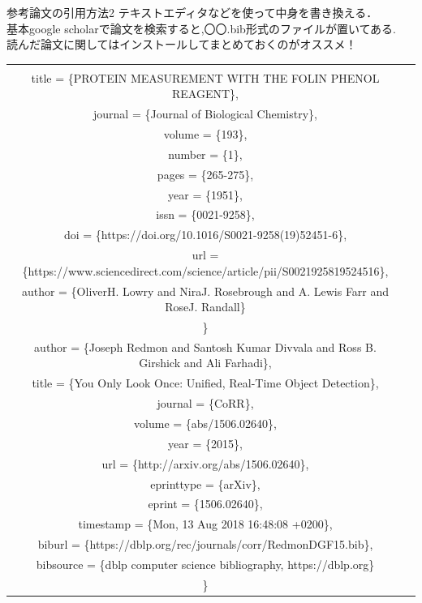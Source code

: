 \documentclass[aspectratio=169, dvipdfmx, 12pt]{beamer}
\begin{document}
\begin{frame}{参考論文の引用方法2}
    テキストエディタなどを使って中身を書き換える．\\
    {\color{red}基本google scholarで論文を検索すると,〇〇.bib形式のファイルが置いてある.\\
    読んだ論文に関してはインストールしてまとめておくのがオススメ！}
    \begin{tabular}{cc}
      \begin{minipage}[t]{0.45\hsize}
        \fontsize{5pt}{0cm}\selectfont{@article\{LOWRY1951265,\\
        title = \{PROTEIN MEASUREMENT WITH THE FOLIN PHENOL REAGENT\},\\
        journal = \{Journal of Biological Chemistry\},\\
        volume = \{193\},\\
        number = \{1\},\\
        pages = \{265-275\},\\
        year = \{1951\},\\
        issn = \{0021-9258\},\\
        doi = \{https://doi.org/10.1016/S0021-9258(19)52451-6\},\\
        url = \{https://www.sciencedirect.com/science/article/pii/S0021925819524516\},\\
        author = \{OliverH. Lowry and NiraJ. Rosebrough and A. Lewis Farr and RoseJ. Randall\}\\
        \}}
      \end{minipage} 
      \begin{minipage}[t]{0.45\hsize}
        \fontsize{5pt}{0cm}\selectfont{@article\{Yolo,\\
        author       = \{Joseph Redmon and Santosh Kumar Divvala and Ross B. Girshick and Ali Farhadi\},\\
        title        = \{You Only Look Once: Unified, Real-Time Object Detection\},\\
        journal      = \{CoRR\},\\
        volume       = \{abs/1506.02640\},\\
        year         = \{2015\},\\
        url          = \{http://arxiv.org/abs/1506.02640\},\\
        eprinttype    = \{arXiv\},\\
        eprint       = \{1506.02640\},\\
        timestamp    = \{Mon, 13 Aug 2018 16:48:08 +0200\},\\
        biburl       = \{https://dblp.org/rec/journals/corr/RedmonDGF15.bib\},\\
        bibsource    = \{dblp computer science bibliography, https://dblp.org\}\\
        \}}
      \end{minipage} 
    \end{tabular}
\end{frame}
\end{document}
